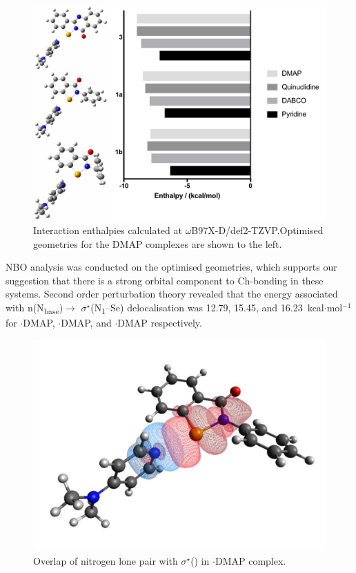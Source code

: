 \begin{refsection}
    \begin{figure}
      \centering
      \includegraphics[width=0.8\linewidth]{Figures/dft-energies.pdf}
      \caption[Interaction energies for various complexes.]{Interaction enthalpies calculated at $ \omega $B97X-D/def2-TZVP.\@ Optimised geometries for the DMAP complexes are shown to the left.}
    \end{figure}
    
    NBO analysis was conducted on the optimised geometries, which supports our suggestion that there is a strong orbital component to Ch-bonding in these systems.
    Second order perturbation theory revealed that the energy associated with n(N\textsubscript{base})$ \rightarrow $ $ \sigma^{\star} $(N\textsubscript{1}--Se) delocalisation was 12.79, 15.45, and 16.23~kcal$\cdot$mol$^{-1}$ for $ \cdot $DMAP, $ \cdot $DMAP, and $ \cdot $DMAP respectively.
    
    \begin{figure}
      \centering
      \includegraphics[width=0.6\linewidth]{Figures/phenyl-dmap-overlap.pdf}
      \caption[Orbital overlap for $ \cdot $DMAP.]{Overlap of nitrogen lone pair with $ \sigma^{\star} $() in $ \cdot $DMAP complex.}\label{fig:phenyl-dmap-overlap}
    \end{figure}
    

\end{refsection}

